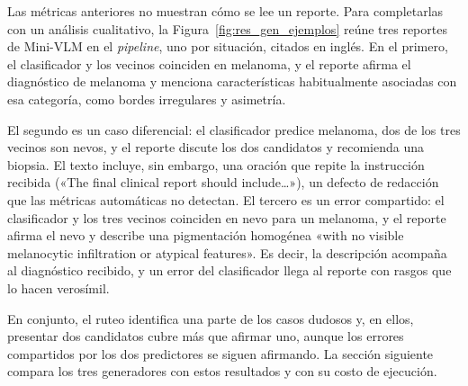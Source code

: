 Las métricas anteriores no muestran cómo se lee un reporte. Para completarlas con un análisis cualitativo, la
Figura~\ref{fig:res_gen_ejemplos} reúne tres reportes de
Mini-VLM en el \emph{pipeline}, uno por situación, citados en inglés. En el primero, el clasificador y los vecinos coinciden en
melanoma, y el reporte afirma el diagnóstico de melanoma y menciona características habitualmente asociadas con esa categoría, como bordes irregulares y asimetría.

El segundo es un caso diferencial: el clasificador predice melanoma, dos de los tres vecinos son nevos, y el reporte
discute los dos candidatos y recomienda una biopsia. El texto incluye, sin embargo, una oración que repite la
instrucción recibida («The final clinical report should include…»), un defecto de redacción que las métricas
automáticas no detectan. El tercero es un error compartido: el clasificador y los tres vecinos coinciden en nevo para
un melanoma, y el reporte afirma el nevo y describe una pigmentación homogénea «with no visible melanocytic infiltration or atypical features». Es decir, la
descripción acompaña al diagnóstico recibido, y un error del clasificador llega al reporte con rasgos que lo hacen
verosímil.

En conjunto, el ruteo identifica una parte de los casos dudosos y, en ellos, presentar dos candidatos cubre más que
afirmar uno, aunque los errores compartidos por los dos predictores se siguen afirmando. La sección siguiente compara
los tres generadores con estos resultados y con su costo de ejecución.


